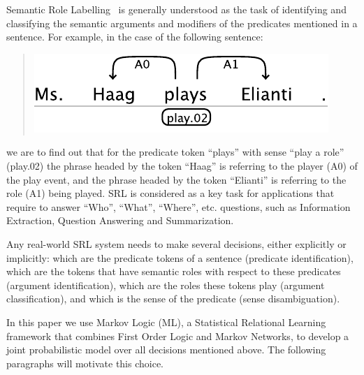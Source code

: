 
Semantic Role Labelling~\citep[SRL, ][]{marquez08srl}
is generally understood as the task of identifying and classifying the semantic arguments and modifiers of the predicates mentioned in a sentence. For example, in the case of the following sentence:
\begin{quote}
\begin{center}
    \includegraphics[scale=.63]{haag-example}
\end{center}
\end{quote}
we are to find out that for the predicate token {}``plays'' with sense ``play a role'' (play.02) the
phrase headed by the token {}``Haag'' is referring to the player (A0) of the play event, and
the phrase headed by the token {}``Elianti''  is referring to the role (A1)
being played. 
SRL is considered as a key task for applications that require to
answer {}``Who'', {}``What'', {}``Where'', etc. questions, such
as Information Extraction, Question Answering and Summarization. 

Any real-world SRL system needs to make several decisions, either
explicitly or implicitly: which are the predicate tokens of a sentence
(predicate identification), which are the tokens that have semantic
roles with respect to these predicates (argument identification),
which are the roles these tokens play (argument classification), and
which is the sense of the predicate (sense disambiguation).

In this paper we use Markov Logic (ML), a Statistical Relational Learning
framework that combines First Order Logic and Markov Networks, to
develop a joint probabilistic model over all decisions mentioned above.
The following paragraphs will motivate this choice. %

